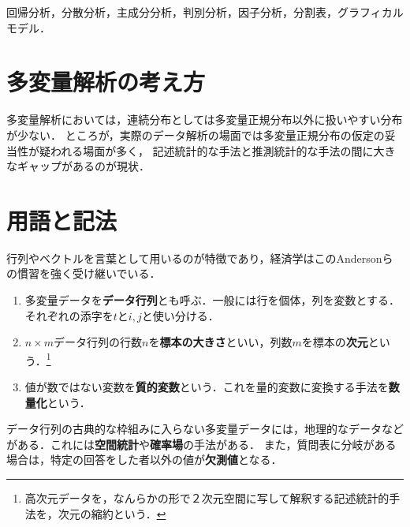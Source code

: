 \documentclass[uplatex,dvipdfmx]{jsreport}
\begin{document}
\begin{example}
    回帰分析，分散分析，主成分分析，判別分析，因子分析，分割表，グラフィカルモデル．
\end{example}

\section{多変量解析の考え方}

多変量解析においては，連続分布としては多変量正規分布以外に扱いやすい分布が少ない．
ところが，実際のデータ解析の場面では多変量正規分布の仮定の妥当性が疑われる場面が多く，
記述統計的な手法と推測統計的な手法の間に大きなギャップがあるのが現状．\cite{フロンティア１}

\section{用語と記法}

\begin{tcolorbox}[colframe=ForestGreen, colback=ForestGreen!10!white,breakable,colbacktitle=ForestGreen!40!white,coltitle=black,fonttitle=\bfseries\sffamily,
title=]
    行列やベクトルを言葉として用いるのが特徴であり，経済学はこのAndersonらの慣習を強く受け継いでいる．
\end{tcolorbox}

\begin{definition}\mbox{}
    \begin{enumerate}
        \item 多変量データを\textbf{データ行列}とも呼ぶ．一般には行を個体，列を変数とする．それぞれの添字を$t$と$i,j$と使い分ける．
        \item $n\times m$データ行列の行数$n$を\textbf{標本の大きさ}といい，列数$m$を標本の\textbf{次元}という．\footnote{高次元データを，なんらかの形で２次元空間に写して解釈する記述統計的手法を，次元の縮約という．}
        \item 値が数ではない変数を\textbf{質的変数}という．これを量的変数に変換する手法を\textbf{数量化}という．
    \end{enumerate}
\end{definition}
\begin{remark}
    データ行列の古典的な枠組みに入らない多変量データには，地理的なデータなどがある．これには\textbf{空間統計}や\textbf{確率場}の手法がある．
    また，質問表に分岐がある場合は，特定の回答をした者以外の値が\textbf{欠測値}となる．
\end{remark}
\end{document}
